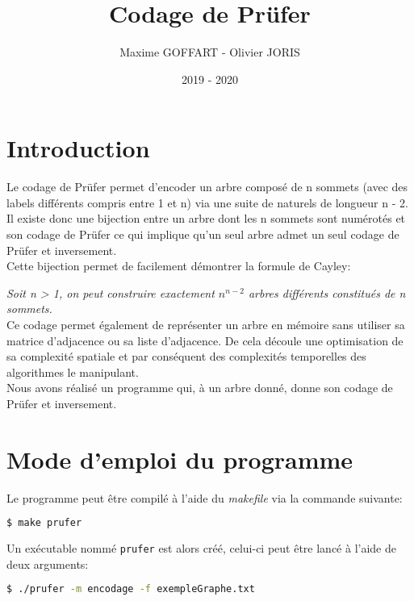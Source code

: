 \documentclass[a4paper, 11pt, oneside]{article}
\title{Codage de Prüfer}
\author{Maxime GOFFART - Olivier JORIS}
\date{2019 - 2020}
\begin{document}
\maketitle
\newpage

\tableofcontents
\newpage

\section{Introduction}

Le codage de Prüfer permet d'encoder un arbre composé de n sommets (avec des labels différents compris entre 1 et n) via une suite de naturels de longueur n - 2. Il existe donc une bijection entre un arbre dont les n sommets sont numérotés et son codage de Prüfer ce qui implique qu'un seul arbre admet un seul codage de Prüfer et inversement.\\

Cette bijection permet de facilement démontrer la formule de Cayley:\

\textit{Soit n > 1, on peut construire exactement $n^{n-2}$ arbres différents constitués de n sommets.}\\

Ce codage permet également de représenter un arbre en mémoire sans utiliser sa matrice d'adjacence ou sa liste d'adjacence. De cela découle une optimisation de sa complexité spatiale et par conséquent des complexités temporelles des algorithmes le manipulant.\\

Nous avons réalisé un programme qui, à un arbre donné, donne son codage de Prüfer et inversement.

\section{Mode d'emploi du programme}

Le programme peut être compilé à l'aide du \textit{makefile} via la commande suivante:

\begin{lstlisting}[language=bash]
$ make prufer
\end{lstlisting}

Un exécutable nommé \texttt{prufer} est alors créé, celui-ci peut être lancé à l'aide de deux arguments:

\begin{lstlisting}[language=bash]
$ ./prufer -m encodage -f exempleGraphe.txt
\end{lstlisting}
\end{document}
